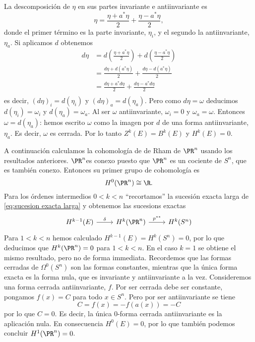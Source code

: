 \documentclass[12pt]{article}
\begin{document}
La descomposición de \( \eta \) en sus partes invariante e antiinvariante es 
\begin{equation*}
	\eta = \frac{\eta + a^\ast \eta}{2} + \frac{\eta - a^\ast \eta}{2},
\end{equation*}
donde el primer término es la parte invariante, \( \eta_i \), y el segundo la
antiinvariante, \( \eta_a \). Si aplicamos \( d \) obtenemos
\begin{align*}
	d\eta & = d\left(\frac{\eta + a^\ast \eta}{2}\right) + d\left(\frac{\eta - a^\ast
	\eta}{2}\right) \\
				& =	\frac{d\eta + d(a^\ast \eta)}{2} + \frac{d\eta - d(a^\ast \eta)}{2} \\
				& = \frac{d\eta + a^\ast d\eta}{2} + \frac{d\eta - a^\ast d\eta}{2} \\
\end{align*}
es decir, \( (d\eta)_i = d(\eta_i) \) y \( (d\eta)_a = d(\eta_a) \). Pero como \( d\eta =
\omega \) deducimos \( d(\eta_i) = \omega_i \) y \( d(\eta_a) = \omega_a \). Al ser \(
\omega \) antiinvariante, \( \omega_i = 0 \) y \( \omega_a = \omega \). Entonces \( \omega
= d(\eta_a) \): hemos escrito \( \omega \) como la imagen por \( d \) de una forma
antiinvariante, \( \eta_a \). Es decir, \( \omega \) es cerrada. Por lo tanto \( Z^k(E)
= B^k(E) \) y \( H^k(E) = 0 \).

\parbreak

A continuación calculamos la cohomología de de Rham de \( \PR^n \) usando los resultados
anteriores. \( \PR^n \)es conexo puesto que \( \PR^n \) es un cociente de \( S^n \), que
es también conexo. Entonces su primer grupo de cohomología es 
\begin{equation*}
	H^0(\PR^n) \cong \R.
\end{equation*}
Para los órdenes intermedios \( 0 < k < n \) ``recortamos'' la sucesión exacta larga de
\eqref{eq:sucesion exacta larga} y obtenemos las sucesions exactas
\begin{equation*}
	\begin{tikzcd}
		H^{k-1}(E) \arrow[r, "\delta"] & H^{k}(\PR^n) \arrow[r, "p^{\ast \ast}"] & H^k(S^n)
	\end{tikzcd}
\end{equation*}
Para \( 1 < k < n \) hemos calculado \( H^{k-1}(E) = H^{k}(S^n) = 0 \), por lo que
deducimos que \( H^k(\PR^n) = 0 \) para \( 1 < k < n \). En el caso \( k = 1 \) se obtiene
el mismo resultado, pero no de forma immediata. Recordemos que las formas cerradas de \(
\Omega^0(S^n) \) son las formas constantes, mientras que la única forma exacta es la forma
nula, que es invariante y antiinvariante a la vez. Consideremos una forma cerrada
antiinvariante, \( f \). Por ser cerrada debe ser constante, pongamos \( f(x) = C \) para
todo \( x \in S^n \). Pero por ser antiinvariante se tiene
\begin{equation*}
	C = f(x) = -f(a(x)) = -C
\end{equation*}
por lo que \( C = 0 \). Es decir, la única 0-forma cerrada antiinvariante es la aplicación
nula. En consecuencia \( H^0(E) = 0 \), por lo que también podemos concluir \( H^1(\PR^n)
= 0 \).
\end{document}
